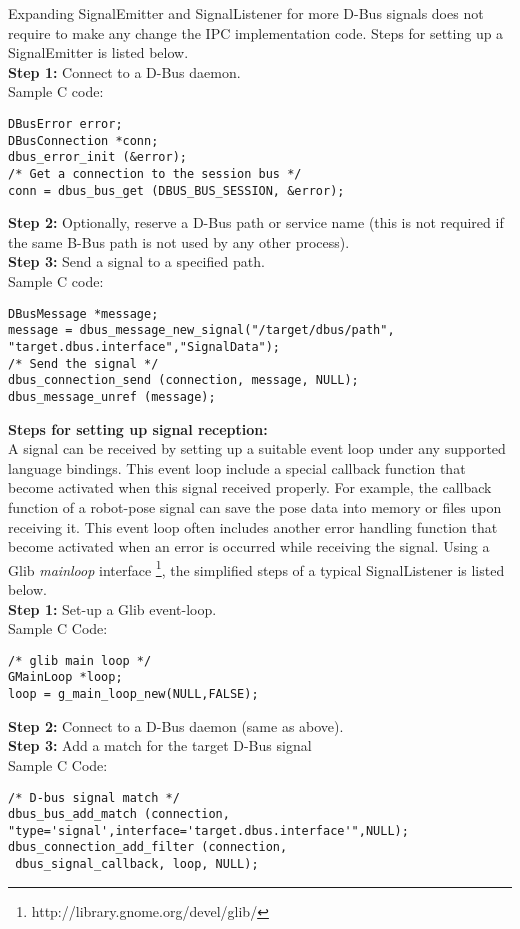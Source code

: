 Expanding SignalEmitter and SignalListener for more D-Bus signals does not require to make any change the IPC implementation code. Steps for setting up a SignalEmitter is listed below.\\
\textbf{Step 1:} Connect to a D-Bus daemon. \\
Sample C code:
\lstset{language=C,basicstyle=\small}
\begin{lstlisting}
DBusError error;
DBusConnection *conn;
dbus_error_init (&error);
/* Get a connection to the session bus */
conn = dbus_bus_get (DBUS_BUS_SESSION, &error);
\end{lstlisting}
\textbf{Step 2:} Optionally, reserve a D-Bus path or service name (this is not required if the same B-Bus path is not used by any other process).\\
\textbf{Step 3:} Send a signal to a specified path.\\
Sample C code:
\begin{lstlisting} 
DBusMessage *message;
message = dbus_message_new_signal("/target/dbus/path",
"target.dbus.interface","SignalData");
/* Send the signal */
dbus_connection_send (connection, message, NULL);
dbus_message_unref (message);
\end{lstlisting}
\textbf{Steps for setting up signal reception:}\\ 
A signal can be received by setting up a suitable event loop under any supported language bindings. This event loop include a special callback function that become activated when this signal received properly. For example, the callback function of a robot-pose signal can save the pose data into memory or files upon receiving it. This event loop often includes another error handling function that become activated when an error is occurred while receiving the signal. Using a Glib {\em mainloop} interface \footnote{http://library.gnome.org/devel/glib/}, the simplified steps of a typical SignalListener is listed below.\\
\textbf{Step 1:} Set-up a Glib event-loop.\\
Sample C Code:
\begin{lstlisting} 
/* glib main loop */
GMainLoop *loop;
loop = g_main_loop_new(NULL,FALSE);
\end{lstlisting} 
\textbf{Step 2:} Connect to a D-Bus daemon (same as above).\\
\textbf{Step 3:} Add a match for the target D-Bus signal\\
Sample C Code:
\begin{lstlisting} 
/* D-bus signal match */
dbus_bus_add_match (connection,
"type='signal',interface='target.dbus.interface'",NULL);
dbus_connection_add_filter (connection, 
 dbus_signal_callback, loop, NULL);
\end{lstlisting} 

